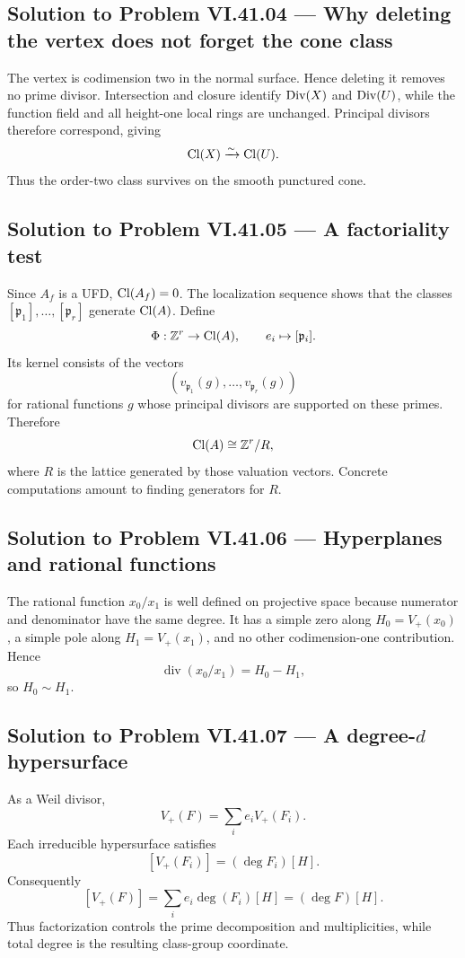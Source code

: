 \subsection*{Solution to Problem VI.41.04 — Why deleting the vertex does not forget the cone class}
\begin{solution}
The vertex is codimension two in the normal surface. Hence deleting it removes no
prime divisor. Intersection and closure identify \(\operatorname{Div}(X)\) and \(\operatorname{Div}(U)\), while
the function field and all height-one local rings are unchanged. Principal divisors
therefore correspond, giving
\[
\operatorname{Cl}(X)\xrightarrow{\sim}\operatorname{Cl}(U).
\]
Thus the order-two class survives on the smooth punctured cone.
\end{solution}

\subsection*{Solution to Problem VI.41.05 — A factoriality test}
\begin{solution}
Since \(A_f\) is a UFD, \(\operatorname{Cl}(A_f)=0\). The localization sequence shows that the
classes \([\mathfrak p_1],\ldots,[\mathfrak p_r]\) generate \(\operatorname{Cl}(A)\). Define
\[
\Phi:\mathbb Z^r\to\operatorname{Cl}(A),\qquad e_i\mapsto[\mathfrak p_i].
\]
Its kernel consists of the vectors
\[
(v_{\mathfrak p_1}(g),\ldots,v_{\mathfrak p_r}(g))
\]
for rational functions \(g\) whose principal divisors are supported on these primes.
Therefore
\[
\operatorname{Cl}(A)\cong\mathbb Z^r/R,
\]
where \(R\) is the lattice generated by those valuation vectors. Concrete computations
amount to finding generators for \(R\).
\end{solution}

\subsection*{Solution to Problem VI.41.06 — Hyperplanes and rational functions}
\begin{solution}
The rational function \(x_0/x_1\) is well defined on projective space because numerator
and denominator have the same degree. It has a simple zero along
\(H_0=V_+(x_0)\), a simple pole along \(H_1=V_+(x_1)\), and no other
codimension-one contribution. Hence
\[
\operatorname{div}(x_0/x_1)=H_0-H_1,
\]
so \(H_0\sim H_1\).
\end{solution}

\subsection*{Solution to Problem VI.41.07 — A degree-\(d\) hypersurface}
\begin{solution}
As a Weil divisor,
\[
V_+(F)=\sum_i e_iV_+(F_i).
\]
Each irreducible hypersurface satisfies
\[
[V_+(F_i)]=(\deg F_i)[H].
\]
Consequently
\[
[V_+(F)]=\sum_i e_i\deg(F_i)[H]=(\deg F)[H].
\]
Thus factorization controls the prime decomposition and multiplicities, while total
degree is the resulting class-group coordinate.
\end{solution}

